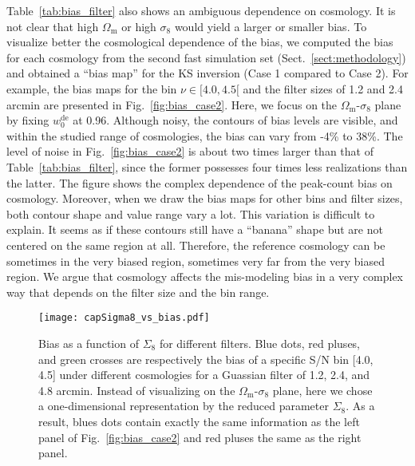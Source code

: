\documentclass{aa} %
\newcommand{\fig}[1]{Fig.~\ref{#1}}
\newcommand{\tab}[1]{Table~\ref{#1}}
\newcommand{\sect}[1]{Sect.~\ref{#1}}
\newcommand{\OmegaM}{\Omega_\mathrm{m}}
\newcommand{\sigEig}{\sigma_8}
\newcommand{\wZero}{w_0^\mathrm{de}}
\begin{document}
\tab{tab:bias_filter} also shows an ambiguous dependence on cosmology. It is not clear that high $\OmegaM$ or high $\sigEig$ would yield a larger or smaller bias. To visualize better the cosmological dependence of the bias, we computed the bias for each cosmology from the second fast simulation set (\sect{sect:methodology}) and obtained a ``bias map'' for the KS inversion (Case 1 compared to Case 2). For example, the bias maps for the bin $\nu\in[4.0, 4.5[$ and the filter sizes of 1.2 and 2.4 arcmin are presented in \fig{fig:bias_case2}. Here, we focus on the $\OmegaM$-$\sigEig$ plane by fixing $\wZero$ at 0.96. Although noisy, the contours of bias levels are visible, and within the studied range of cosmologies, the bias can vary from -4\% to 38\%. The level of noise in \fig{fig:bias_case2} is about two times larger than that of \tab{tab:bias_filter}, since the former possesses four times less realizations than the latter. The figure shows the complex dependence of the peak-count bias on cosmology. Moreover, when we draw the bias maps for other bins and filter sizes, both contour shape and value range vary a lot. This variation is difficult to explain. It seems as if these contours still have a ``banana'' shape but are not centered on the same region at all. Therefore, the reference cosmology can be sometimes in the very biased region, sometimes very far from the very biased region. We argue that cosmology affects the mis-modeling bias in a very complex way that depends on the filter size and the bin range. 

\begin{figure}[tb]
        \centering
        \texttt{[image: capSigma8\_vs\_bias.pdf]}
        \caption{Bias as a function of $\Sigma_8$ for different filters. Blue dots, red pluses, and green crosses are respectively the bias of a specific S/N bin [4.0, 4.5] under different cosmologies for a Guassian filter of 1.2, 2.4, and 4.8 arcmin. Instead of visualizing on the $\OmegaM$-$\sigEig$ plane, here we chose a one-dimensional representation by the reduced parameter $\Sigma_8$. As a result, blues dots contain exactly the same information as the left panel of \fig{fig:bias_case2} and red pluses the same as the right panel.}
        \label{fig:capSigma8_vs_bias}
\end{figure}
\end{document}
